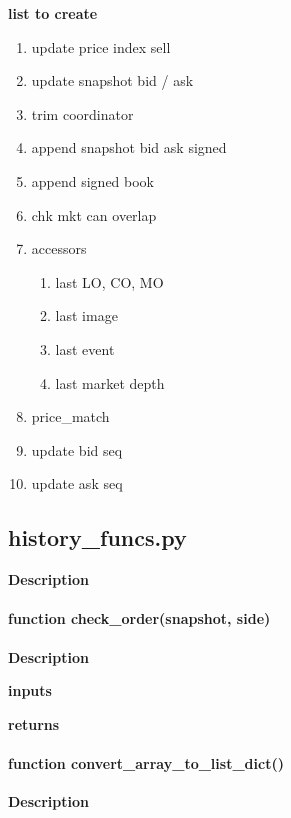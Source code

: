 \documentclass[refman]{article}
\begin{document}



	








%

\textbf{list to create}
\begin{enumerate}
	\item update price index sell
	\item update snapshot bid / ask
	\item trim coordinator
	\item append snapshot bid ask signed
	\item append signed book
	\item chk mkt can overlap
	\item accessors\begin{enumerate}
		\item last LO, CO, MO
		\item last image
		\item last event
		\item last market depth
	\end{enumerate}
	\item price\_match 
	\item update bid seq
	\item update ask seq
\end{enumerate}



\subsection{history\_funcs.py}\hfill \break
\noindent \textbf{Description}



\paragraph{\textbf{function} check\_order(snapshot, side)}\hfill\break
\noindent \textbf{Description}

\noindent \textbf{inputs}

\noindent \textbf{returns}

\paragraph{\textbf{function} convert\_array\_to\_list\_dict()}\hfill\break
\noindent \textbf{Description}
\end{document}
